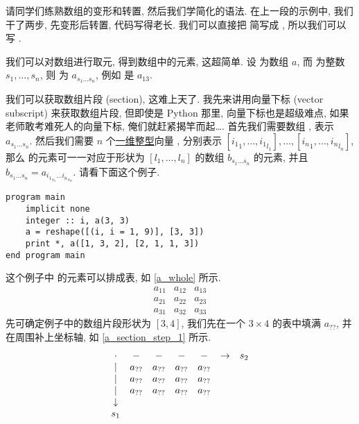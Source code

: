 请同学们练熟数组的变形和转置, 然后我们学简化的语法. 在上一段的示例中, 我们干了两步, 先变形后转置, 代码写得老长. 我们可以直接把  简写成 , 所以我们可以写 .

我们可以对数组进行取元, 得到数组中的元素, 这超简单. 设  为数组 $a$, 而  为整数 $s_1,\dots,s_n$, 则  为 $a_{s_1\dots s_n}$, 例如  是 $a_{13}$.

我们可以获取数组片段 (section), 这难上天了. 我先来讲用向量下标 (vector subscript) 来获取数组片段, 但即使是 Python 那里, 向量下标也是超级难点, 如果老师敢考难死人的向量下标, 俺们就赶紧揭竿而起\dots{}. 首先我们需要数组 , 表示 $a_{s_1\dots s_n}$. 然后我们需要 $n$ 个\uline{一维整型}向量 , 分别表示 $[{i_1}_1,\dots,{i_1}_{l_1}],\dots,[{i_n}_1,\dots,{i_n}_{l_n}]$, 那么  的元素可一一对应于形状为 $[l_1,\dots,l_n]$ 的数组 $b_{s_1\dots s_n}$ 的元素, 并且 $b_{s_1\dots s_n}=a_{{i_1}_{s_1}\dots {{i_n}_{s_n}}}$. 请看下面这个例子.
\begin{lstlisting}
program main
    implicit none
    integer :: i, a(3, 3)
    a = reshape([(i, i = 1, 9)], [3, 3])
    print *, a([1, 3, 2], [2, 1, 1, 3])
end program main
\end{lstlisting}
这个例子中  的元素可以排成表, 如 \eqref{a_whole} 所示.
\begin{equation}
    \begin{matrix}
        a_{11}&a_{12}&a_{13}\\
        a_{21}&a_{22}&a_{23}\\
        a_{31}&a_{32}&a_{33}
    \end{matrix}\label{a_whole}
\end{equation}
先可确定例子中的数组片段形状为 $[3, 4]$, 我们先在一个 $3\times4$ 的表中填满 $a_{??}$, 并在周围补上坐标轴, 如 \eqref{a_section_step_1} 所示.
\begin{equation}
    \begin{matrix}
        \cdot&-&-&-&-&\rightarrow&s_2\\
        |&a_{??}&a_{??}&a_{??}&a_{??}&\\
        |&a_{??}&a_{??}&a_{??}&a_{??}&\\
        |&a_{??}&a_{??}&a_{??}&a_{??}&\\
        \downarrow&&&&&&\\
        s_1&&&&&&
    \end{matrix}\label{a_section_step_1}
\end{equation}
